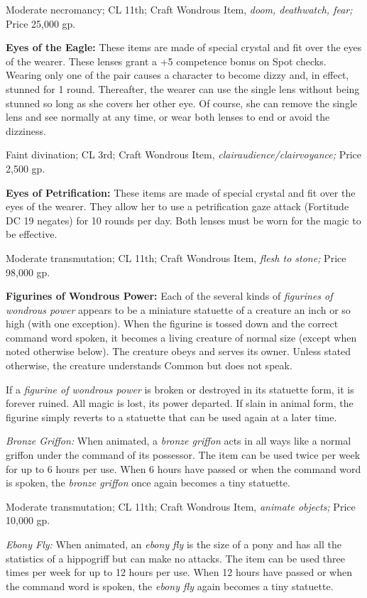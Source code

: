 \documentclass{article}
\begin{document}
Moderate necromancy; CL 11th; Craft Wondrous Item, \textit{doom, deathwatch, fear; 
}Price 25,000 gp.

\textbf{Eyes of the Eagle:} These items are made of special crystal and fit over 
the eyes of the wearer. These lenses grant a +5 competence bonus on Spot checks. 
Wearing only one of the pair causes a character to become dizzy and, in effect, 
stunned for 1 round. Thereafter, the wearer can use the single lens without being 
stunned so long as she covers her other eye. Of course, she can remove the single 
lens and see normally at any time, or wear both lenses to end or avoid the dizziness.

Faint divination; CL 3rd; Craft Wondrous Item, \textit{clairaudience/clairvoyance; 
}Price 2,500 gp.

\textbf{Eyes of Petrification: }These items are made of special crystal and fit 
over the eyes of the wearer. They allow her to use a petrification gaze attack 
(Fortitude DC 19 negates) for 10 rounds per day. Both lenses must be worn for the 
magic to be effective.

Moderate transmutation; CL 11th; Craft Wondrous Item, \textit{flesh to stone; }Price 
98,000 gp.

\textbf{Figurines of Wondrous Power:} Each of the several kinds of \textit{figurines 
of wondrous power }appears to be a miniature statuette of a creature an inch or 
so high (with one exception). When the figurine is tossed down and the correct 
command word spoken, it becomes a living creature of normal size (except when noted 
otherwise below). The creature obeys and serves its owner. Unless stated otherwise, 
the creature understands Common but does not speak.

If a \textit{figurine of wondrous power }is broken or destroyed in its statuette 
form, it is forever ruined. All magic is lost, its power departed. If slain in 
animal form, the figurine simply reverts to a statuette that can be used again 
at a later time.

\textit{Bronze Griffon: }When animated, a \textit{bronze griffon }acts in all ways 
like a normal griffon under the command of its possessor. The item can be used 
twice per week for up to 6 hours per use. When 6 hours have passed or when the 
command word is spoken, the \textit{bronze griffon }once again becomes a tiny statuette.

Moderate transmutation; CL 11th; Craft Wondrous Item, \textit{animate objects; 
}Price 10,000 gp.

\textit{Ebony Fly: }When animated, an \textit{ebony fly }is the size of a pony 
and has all the statistics of a hippogriff but can make no attacks. The item can 
be used three times per week for up to 12 hours per use. When 12 hours have passed 
or when the command word is spoken, the \textit{ebony fly }again becomes a tiny 
statuette.
\end{document}
